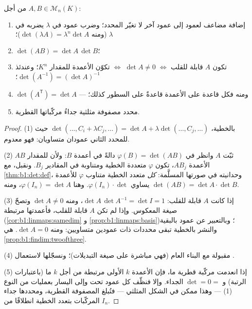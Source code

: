 \begin{theorem}[الخصائص]\label{thm:b1:det:props}
من أجل $A, B \in \mathcal{M}_n(K)$:
\begin{enumerate}
  \item إضافة مضاعف لعمود إلى عمود آخر لا تغيّر
        المحدد؛ وضرب عمود في $\lambda$ يضربه
        في $\lambda$ (ومنه $\det(\lambda A) = \lambda^n \det A$)؛
  \item $\det(AB) = \det A\, \det B$؛
  \item تكون $A$ قابلة للقلب $\iff$ $\det A \neq 0$ $\iff$ تكوّن الأعمدة
         للمقدار $K^n$؛ وعندئذ $\det(A^{-1}) = (\det
        A)^{-1}$؛
  \item $\det(A^{\mathsf T}) = \det A$ --- ومنه فكل قاعدة على الأعمدة
        قاعدةٌ على السطور كذلك؛
  \item محدد مصفوفة مثلثية جداءُ مركّباتها
        القطرية.
\end{enumerate}
\end{theorem}

\begin{proof}
(1) بالخطية، $\det(\dots, C_i + \lambda C_j, \dots) = \det A +
\lambda\det(\dots, C_j, \dots)$ حيث للمحدد الثاني عمودان
متساويان: فهو معدوم.

(2) ثبّت $A$ وانظر في $\varphi(B) = \det(AB)$ دالةً في
أعمدة $B$: ولأن للمقدار $AB$ الأعمدة $AB_j$، تكون $\varphi$
متعددة الخطية ومتناوبة في المقادير $B_j$. ونقبل، مع
\cref{thm:b1:det:def}،  وحدانيته في صورتها المسلَّمة:
\emph{كل}  متعدد الخطية متناوب $\varphi$ للأعمدة
يساوي $\varphi(I_n) \cdot \det$. وهنا $\varphi(I_n) = \det A$، ومنه
$\det(AB) = \det A \cdot \det B$.

(3) إذا كانت $A$ قابلة للقلب: $\det A\,\det A^{-1} = \det I = 1$، ومنه
$\det A \neq 0$ وتصحّ صيغة المعكوس. وإذا لم تكن $A$
قابلة للقلب، فأعمدتها مرتبطة (\cref{cor:b1:linmaps:samedim}
و \cref{prop:b1:linmaps:basis})؛ وبالتعبير عن عمود بالبقية
والنشر بالخطية تبقى محددات ذات عمودين
متساويين: ومنه $\det A = 0$.   هي
\cref{prop:b1:findim:twoofthree}.

(4) مقبولة مع البناء العام (فهي مباشرة على
صيغة التبديلات)؛ ونسجّلها لاستعمال .

(5) إذا انعدمت مركّبة قطرية ما، فإن الأعمدة $k$ الأولى
مرتبطة من أجل $k$ ما (باعتبارات الرتبة) و $\det = 0 =$ الجداء.
وإلا فنظّف كل عمود تحت وإلى اليسار بعمليات من النوع
(1) --- وهذا ممكن في الشكل المثلثي --- فتُبلغ المصفوفة
القطرية، ومحددها جداء المركّبات
بتعدد الخطية انطلاقًا من $I_n$.
\end{proof}


